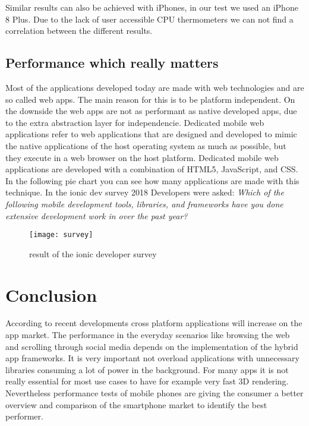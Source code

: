 \documentclass[conference, 11pt]{IEEEtran}
\begin{document}
Similar results can also be achieved with iPhones, in our test we used an iPhone 8 Plus. Due to the lack of user accessible CPU thermometers we can not find a correlation between the different results.
\subsection{Performance which really matters}
Most of the applications developed today are made with web technologies and are so called web apps. The main reason for this is to be platform independent. On the downside the web apps are not as performant as native developed apps, due to the extra abstraction layer for independencie. \newline \newline
Dedicated mobile web applications refer to web applications that are designed and developed to mimic the native applications of the host operating system as much as possible, but they execute in a web browser on the host platform. Dedicated mobile web applications are developed with a combination of HTML5, JavaScript, and CSS. \cite{webapp}
\newline
In the following pie chart you can see how many applications are made with this technique. 
In the ionic dev survey 2018 Developers were asked: 
\textit{Which of the following mobile development tools, libraries, and frameworks have you done extensive development work in over the past year?}\cite{ionic}
\begin{figure}[htbp]
\centerline{\texttt{[image: survey]}}
\caption{result of the ionic developer survey \cite{ionic}}
\label{Figure 5}
\end{figure}
\newpage
\section{Conclusion}
According to recent developments cross platform applications will increase on the app market. The performance in the everyday scenarios like browsing the web and scrolling through social media depends on the implementation of the hybrid app frameworks. It is very important not overload applications with unnecessary libraries consuming a lot of power in the background. For many apps it is not really essential for most use cases to have for example very fast 3D rendering. Nevertheless performance tests of mobile phones are giving the consumer a better overview and comparison of the smartphone market to identify the best performer.




\end{document}
